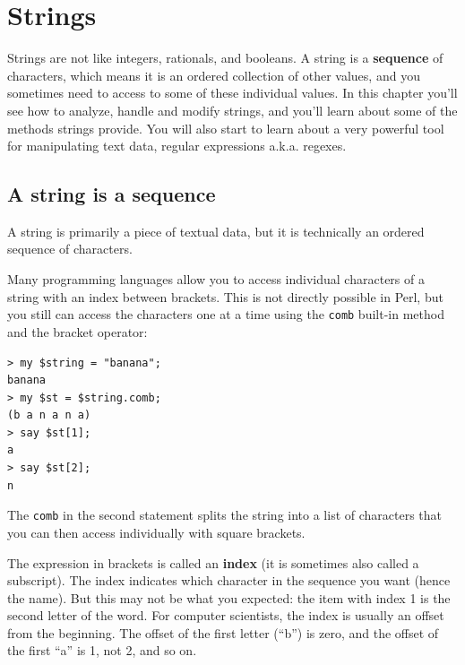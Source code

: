 
\chapter{Strings}
\label{strings}

Strings are not like integers, rationals, and booleans.  
A string is a {\bf sequence} of characters, which means 
it is an ordered collection of other values, and you 
sometimes need to access to some of these individual 
values.  In this chapter you'll see how to analyze, 
handle and modify strings, and you'll learn about some of the methods strings provide. You will also start to learn about 
a very powerful tool for manipulating text data, regular 
expressions a.k.a. regexes.


\section{A string is a sequence}

A string is primarily a piece of textual data, but it 
is technically an ordered sequence of characters.  

Many programming languages allow you to access individual 
characters of a string with an index between brackets. This 
is not directly possible in Perl, but you still can access 
the characters one at a time using the {\tt comb} built-in 
method and the bracket operator:

\begin{verbatim}
> my $string = "banana";
banana
> my $st = $string.comb;
(b a n a n a)
> say $st[1];
a
> say $st[2];
n
\end{verbatim}
%
The {\tt comb} in the second statement splits the string 
into a list of characters that you can then access 
individually with square brackets.

The expression in brackets is called an {\bf index} 
(it is sometimes also called a subscript).  
The index indicates which character in the sequence you
want (hence the name). But this may not be what you 
expected: the item with index 1 is the second letter of 
the word. For computer scientists, the index is usually 
an offset from the beginning. The offset of the first 
letter (``b'') is zero, and the 
offset of the first ``a'' is 1, not 2, and so on.

